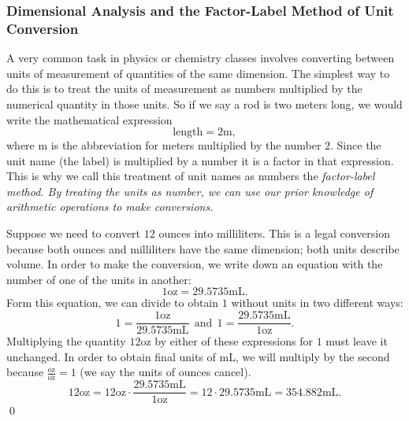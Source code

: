 \subsubsection{Dimensional Analysis and the Factor-Label Method of Unit Conversion} 
A very common task in physics or chemistry classes involves converting between units of measurement of quantities of the same dimension. The simplest way to do this is to treat the units of measurement as numbers multiplied by the numerical quantity in those units. So if we say a rod is two meters long, we would write the mathematical expression
\[
\mbox{length} = 2 \mbox{m},
\]
where $\mbox{m}$ is the abbreviation for meters multiplied by the number $2$. Since the unit name (the label) is multiplied by a number it is a factor in that expression. This is why we call this treatment of unit names as numbers the \it{factor-label method}\normalfont. By treating the units as number, we can use our prior knowledge of arithmetic operations to make conversions.
\par
\begin{eg} Suppose we need to convert $12$ ounces into milliliters. This is a legal conversion because both ounces and milliliters have the same dimension; both units describe volume. In order to make the conversion, we write down an equation with the number of one of the units in another:
\[
1 \mbox{oz} = 29.5735 \mbox{mL}.
\]
Form this equation, we can divide to obtain $1$ without units in two different ways:
\[
1=\frac{1 \mbox{oz}}{29.5735\mbox{mL}}\ \ \mbox{and} \ \ 1=\frac{29.5735 \mbox{mL}}{1 \mbox{oz}}.
\]
Multiplying the quantity $12 \mbox{oz}$ by either of these expressions for $1$ must leave it unchanged. In order to obtain final units of $\mbox{mL}$, we will multiply by the second because $\frac{\mbox{oz}}{\mbox{oz}} = 1$ (we say the units of ounces cancel).
\[
12\mbox{oz} = 12\mbox{oz}\cdot\frac{29.5735\mbox{mL}}{1\mbox{oz}} = 12\cdot 29.5735 \mbox{mL} = 354.882 \mbox{mL}.
\]
\qed
\end{eg}
\par

